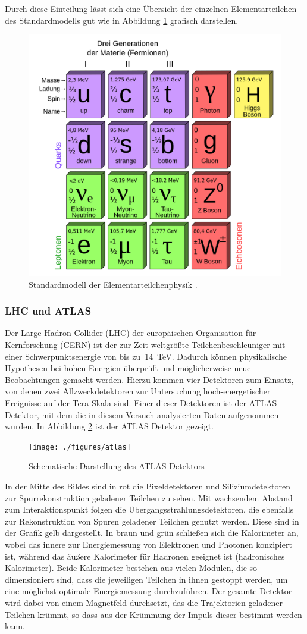 \documentclass[11pt, a4paper]{article}
\numberwithin{equation}{section}
\begin{document}
Durch diese Einteilung lässt sich eine Übersicht der einzelnen Elementarteilchen des Standardmodells gut wie in Abbildung \ref{fig:standardmodell} grafisch darstellen.
\begin{figure}[htbp]
	\centering
	\includegraphics[width=.6\textwidth]{./figures/standardmodell}
	\caption{Standardmodell der Elementarteilchenphysik \cite{wiki_standardmodell}.}
	\label{fig:standardmodell}
\end{figure}

\subsubsection{LHC und ATLAS}

Der Large Hadron Collider (LHC) der europäischen Organisation für Kernforschung (CERN) ist der zur Zeit weltgrößte Teilchenbeschleuniger mit einer Schwerpunktsenergie von bis zu~\SI{14}{TeV}.
Dadurch können physikalische Hypothesen bei hohen Energien überprüft und möglicherweise neue Beobachtungen gemacht werden.
Hierzu kommen vier Detektoren zum Einsatz, von denen zwei Allzweckdetektoren zur Untersuchung hoch-energetischer Ereignisse auf der Tera-Skala sind.
Einer dieser Detektoren ist der ATLAS-Detektor, mit dem die in diesem Versuch analysierten Daten aufgenommen wurden.
In Abbildung \ref{fig:atlas} ist der ATLAS Detektor gezeigt.
\begin{figure}[htbp]
	\centering
	\texttt{[image: ./figures/atlas]}
	\caption{Schematische Darstellung des ATLAS-Detektors \cite{cern}}
	\label{fig:atlas}
\end{figure}
In der Mitte des Bildes sind in rot die Pixeldetektoren und Siliziumdetektoren zur Spurrekonstruktion geladener Teilchen zu sehen.
Mit wachsendem Abstand zum Interaktionspunkt folgen die Übergangsstrahlungsdetektoren, die ebenfalls zur Rekonstruktion von Spuren geladener Teilchen genutzt werden.
Diese sind in der Grafik gelb dargestellt.
In braun und grün schließen sich die Kalorimeter an, wobei das innere zur Energiemessung von Elektronen und Photonen konzipiert ist, während das äußere Kalorimeter für Hadronen geeignet ist (hadronisches Kalorimeter).
Beide Kalorimeter bestehen aus vielen Modulen, die so dimensioniert sind, dass die jeweiligen Teilchen in ihnen gestoppt werden, um eine möglichst optimale Energiemessung durchzuführen.
Der gesamte Detektor wird dabei von einem Magnetfeld durchsetzt, das die Trajektorien geladener Teilchen krümmt, so dass aus der Krümmung der Impuls dieser bestimmt werden kann.
\end{document}
